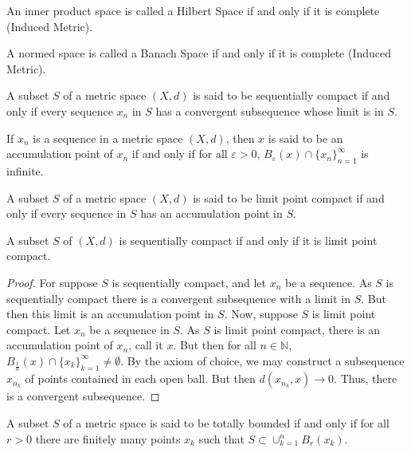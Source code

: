 \documentclass[crop=false,class=article,oneside]{standalone}
\begin{document}
        \begin{definition}
        An inner product space is called a Hilbert Space if and only if it is complete (Induced Metric).
        \end{definition}
        \begin{definition}
        A normed space is called a Banach Space if and only if it is complete (Induced Metric).
        \end{definition}
        \begin{definition}
        A subset $S$ of a metric space $(X,d)$ is said to be sequentially compact if and only if every sequence $x_n$ in $S$ has a convergent subsequence whose limit is in $S$.
        \end{definition}
        \begin{definition}
        If $x_n$ is a sequence in a metric space $(X,d)$, then $x$ is said to be an accumulation point of $x_n$ if and only if for all $\varepsilon>0$, $B_{\varepsilon}(x)\cap \{x_n\}_{n=1}^{\infty}$ is infinite.
        \end{definition}
        \begin{definition}
        A subset $S$ of a metric space $(X,d)$ is said to be limit point compact if and only if every sequence in $S$ has an accumulation point in $S$.
        \end{definition}
        \begin{theorem}
        A subset $S$ of $(X,d)$ is sequentially compact if and only if it is limit point compact.
        \end{theorem}
        \begin{proof}
        For suppose $S$ is sequentially compact, and let $x_n$ be a sequence. As $S$ is sequentially compact there is a convergent subsequence with a limit in $S$. But then this limit is an accumulation point in $S$. Now, suppose $S$ is limit point compact. Let $x_n$ be a sequence in $S$. As $S$ is limit point compact, there is an accumulation point of $x_n$, call it $x$. But then for all $n\in \mathbb{N}$, $B_{\frac{1}{n}}(x)\cap \{x_k\}_{k=1}^{\infty}\ne \emptyset$. By the axiom of choice, we may construct a subsequence $x_{n_k}$ of points contained in each open ball. But then $d(x_{n_k},x)\rightarrow 0$. Thus, there is a convergent subsequence.
        \end{proof}
        \begin{definition}
        A subset $S$ of a metric space is said to be totally bounded if and only if for all $r>0$ there are finitely many points $x_k$ such that $S\subset \cup_{k=1}^{n} B_{r}(x_k)$.
        \end{definition}
\end{document}
